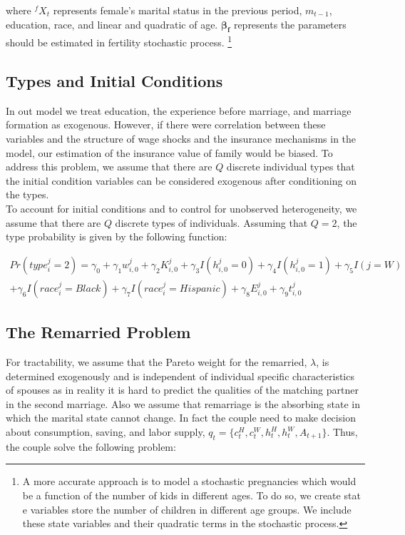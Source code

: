 \noindent where $^fX_t$ represents female's marital status in the previous period, $m_{t-1}$, education, race, and linear and quadratic of age. $\mathbf {\beta_f}$ represents the parameters should be estimated in fertility stochastic process. 
\footnote{A more accurate approach is to model a stochastic pregnancies which would be a function of the number of kids in different ages. To do so, we create stat e variables store the number of children in different age groups. We include these state variables  and their quadratic terms in the stochastic process. }


\subsection{Types and Initial Conditions}

In out model we treat education, the experience before marriage, and marriage formation as exogenous. However, if there were correlation between these variables and the structure of wage shocks and the insurance mechanisms in the model, our estimation of the insurance value of family would be biased. To address this problem, we assume that there are $Q$ discrete individual types that the initial condition variables can be considered exogenous after conditioning on the types. \\

To account for initial conditions and to control for unobserved heterogeneity, we assume that there are $Q$ discrete types of individuals. Assuming that $Q =2$, the type probability is given by the following function: 

\begin{multline*}
Pr(type_{i}^j = 2)  = \gamma_0 + \gamma_1 w_{i,0}^j + \gamma_2 K_{i,0}^j + \gamma_3 I(h_{i,0}^j = 0) + \gamma_4 I(h_{i,0}^j = 1) + \gamma_5 I(j = W) \\
+  \gamma_6 I(race_i^j = Black ) + \gamma_7 I(race_i^j = Hispanic ) + \gamma_8 E_{i,0}^j  + \gamma_9 t_{i,0}^j 
\end{multline*}

\subsection{The Remarried Problem}

For tractability, we assume that the Pareto weight for the remarried, $\lambda$, is determined exogenously and is independent of individual specific characteristics of spouses as in reality it is hard to predict the qualities of the matching partner in the second marriage. Also we assume that remarriage is the absorbing state in which the marital state cannot change. In fact the couple need to make decision about consumption, saving, and labor supply, $q_t = \{c_t^H, c_t^W, h_t^H, h_t^W,A_{t+1}\}$. Thus, the couple solve the following problem: 

